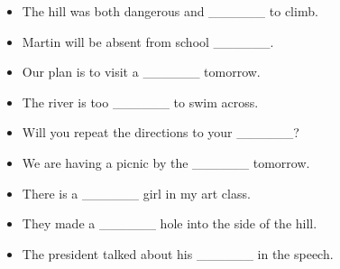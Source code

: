 \documentclass{article}
\begin{document}
\begin{addmargin}[1em]{1em}
\begin{itemize}
    \item The hill was both dangerous and \_\_\_\_\_\_ to climb.
    \item Martin will be absent from school \_\_\_\_\_\_.
    \item Our plan is to visit a \_\_\_\_\_\_ tomorrow.
    \item The river is too \_\_\_\_\_\_ to swim across.
    \item Will you repeat the directions to your \_\_\_\_\_\_?
    \item We are having a picnic by the \_\_\_\_\_\_ tomorrow.
    \item There is a \_\_\_\_\_\_ girl in my art class.
    \item They made a \_\_\_\_\_\_ hole into the side of the hill.
    \item The president talked about his \_\_\_\_\_\_ in the speech.
\end{itemize}
\end{addmargin}
\end{document}
